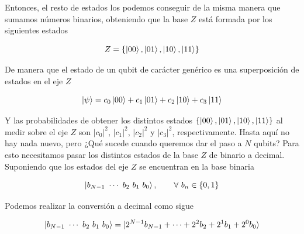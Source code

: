 \documentclass{article}
\numberwithin{equation}{section} %
\begin{document}
    \vspace{2.5mm}

    Entonces, el resto de estados los podemos conseguir de la misma manera que sumamos números binarios, obteniendo que la base \( Z \) está formada por los siguientes estados

    \begin{equation*}
        Z = \{ \ket{0 0}, \ket{0 1}, \ket{1 0}, \ket{1 1} \}
    \end{equation*}

    \vspace{2.5mm}

    De manera que el estado de un qubit de carácter genérico es una superposición de estados en el eje \( Z \)

    \begin{equation}
        \ket{\psi} = c_{0} \ket{0 0} + c_{1} \ket{0 1} + c_{2} \ket{1 0} + c_{3} \ket{1 1}
        \label{eq: superposicion_qubit_2_estados}
    \end{equation}

    \vspace{2.5mm}

    Y las probabilidades de obtener los distintos estados \( \{ \ket{0 0}, \ket{0 1}, \ket{1 0}, \ket{1 1} \} \) al medir sobre el eje \( Z \) son \( | c_{0} |^{2} \), \( | c_{1} |^{2} \), \( | c_{2} |^{2} \) y \( | c_{3} |^{2} \), respectivamente. Hasta aquí no hay nada nuevo, pero ¿Qué sucede cuando queremos dar el paso a \( N \) qubits? Para esto necesitamos pasar los distintos estados de la base \( Z \) de binario a decimal. Suponiendo que los estados del eje \( Z \) se encuentran en la base binaria

    \begin{equation*}
        \ket{b_{N - 1} \ \cdots \ b_{2} \ b_{1} \ b_{0}}, \qquad \forall \ b_{n} \in \{0, 1\}
    \end{equation*}

    \vspace{2.5mm}

    Podemos realizar la conversión a decimal como sigue
    
    \begin{equation}
        \ket{b_{N - 1} \ \cdots \ b_{2} \ b_{1} \ b_{0}} = \ket{ 2^{N - 1} b_{N - 1} + \cdots + 2^{2} b_{2} + 2^{1} b_{1} + 2^{0} b_{0} }
        \label{eq: conversion_qubits_binario_decimal}
    \end{equation}

    \vspace{2.5mm}
\end{document}
